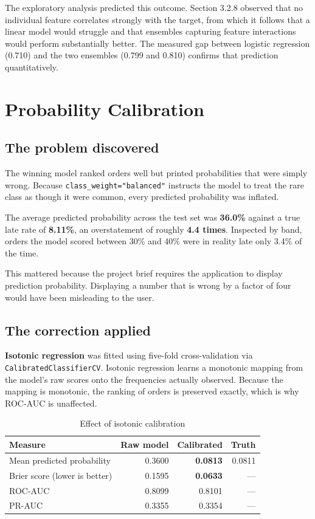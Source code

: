 \documentclass[11pt,a4paper]{report}
\begin{document}
The exploratory analysis predicted this outcome. Section 3.2.8 observed that no
individual feature correlates strongly with the target, from which it follows
that a linear model would struggle and that ensembles capturing feature
interactions would perform substantially better. The measured gap between
logistic regression (0.710) and the two ensembles (0.799 and 0.810) confirms
that prediction quantitatively.

\section{Probability Calibration}

\subsection{The problem discovered}

The winning model ranked orders well but printed probabilities that were simply
wrong. Because \texttt{class\_weight="balanced"} instructs the model to treat the
rare class as though it were common, every predicted probability was inflated.

The average predicted probability across the test set was \textbf{36.0\%} against
a true late rate of \textbf{8.11\%}, an overstatement of roughly
\textbf{4.4 times}. Inspected by band, orders the model scored between 30\% and
40\% were in reality late only 3.4\% of the time.

This mattered because the project brief requires the application to display
prediction probability. Displaying a number that is wrong by a factor of four
would have been misleading to the user.

\subsection{The correction applied}

\textbf{Isotonic regression} was fitted using five-fold cross-validation via
\texttt{CalibratedClassifierCV}. Isotonic regression learns a monotonic mapping
from the model's raw scores onto the frequencies actually observed. Because the
mapping is monotonic, the ranking of orders is preserved exactly, which is why
ROC-AUC is unaffected.

\begin{table}[H]
\centering
\caption{Effect of isotonic calibration}
\begin{tabular}{@{}lrrr@{}}
\toprule
\textbf{Measure} & \textbf{Raw model} & \textbf{Calibrated} & \textbf{Truth} \\
\midrule
Mean predicted probability & 0.3600 & \textbf{0.0813} & 0.0811 \\
Brier score (lower is better) & 0.1595 & \textbf{0.0633} & --- \\
ROC-AUC & 0.8099 & 0.8101 & --- \\
PR-AUC & 0.3355 & 0.3354 & --- \\
\bottomrule
\end{tabular}
\end{table}
\end{document}
